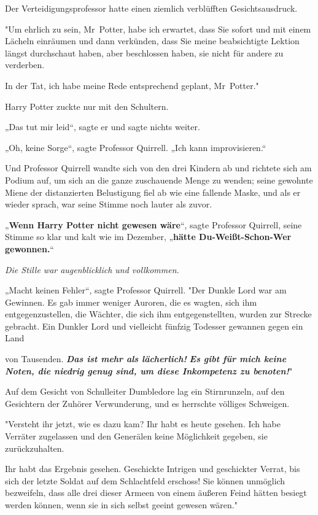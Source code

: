 {Der Verteidigungsprofessor hatte einen ziemlich verblüfften Gesichtsausdruck.

"Um ehrlich zu sein, Mr~Potter, habe ich erwartet, dass Sie sofort und mit einem Lächeln einräumen und dann verkünden, dass Sie meine beabsichtigte Lektion längst durchschaut haben, aber beschlossen haben, sie nicht für andere zu verderben.

In der Tat, ich habe meine Rede entsprechend geplant, Mr~Potter."

Harry Potter zuckte nur mit den Schultern.

„Das tut mir leid“, sagte er und sagte nichts weiter.

„Oh, keine Sorge“, sagte Professor Quirrell. „Ich kann improvisieren.“

Und Professor Quirrell wandte sich von den drei Kindern ab und richtete sich am Podium auf, um sich an die ganze zuschauende Menge zu wenden; seine gewohnte Miene der distanzierten Belustigung fiel ab wie eine fallende Maske, und als er wieder sprach, war seine Stimme noch lauter als zuvor.

„\textbf{Wenn Harry Potter nicht gewesen wäre}“, sagte Professor Quirrell, seine Stimme so klar und kalt wie im Dezember, „\textbf{hätte Du-Weißt-Schon-Wer gewonnen.}“

\emph{Die Stille war augenblicklich und vollkommen.}

„Macht keinen Fehler“, sagte Professor Quirrell. "Der Dunkle Lord war am Gewinnen. Es gab immer weniger Auroren, die es wagten, sich ihm entgegenzustellen, die Wächter, die sich ihm entgegenstellten, wurden zur Strecke gebracht. Ein Dunkler Lord und vielleicht fünfzig Todesser gewannen gegen ein Land

von Tausenden. \textbf{\emph{Das ist mehr als lächerlich!}} \textbf{\emph{Es gibt für mich keine Noten, die niedrig genug sind, um diese Inkompetenz zu benoten!}}"

Auf dem Gesicht von Schulleiter Dumbledore lag ein Stirnrunzeln, auf den Gesichtern der Zuhörer Verwunderung, und es herrschte völliges Schweigen.

"Versteht ihr jetzt, wie es dazu kam? Ihr habt es heute gesehen. Ich habe Verräter zugelassen und den Generälen keine Möglichkeit gegeben, sie zurückzuhalten.

Ihr habt das Ergebnis gesehen. Geschickte Intrigen und geschickter Verrat, bis sich der letzte Soldat auf dem Schlachtfeld erschoss! Sie können unmöglich bezweifeln, dass alle drei dieser Armeen von einem äußeren Feind hätten besiegt werden können, wenn sie in sich selbst geeint gewesen wären."

}
